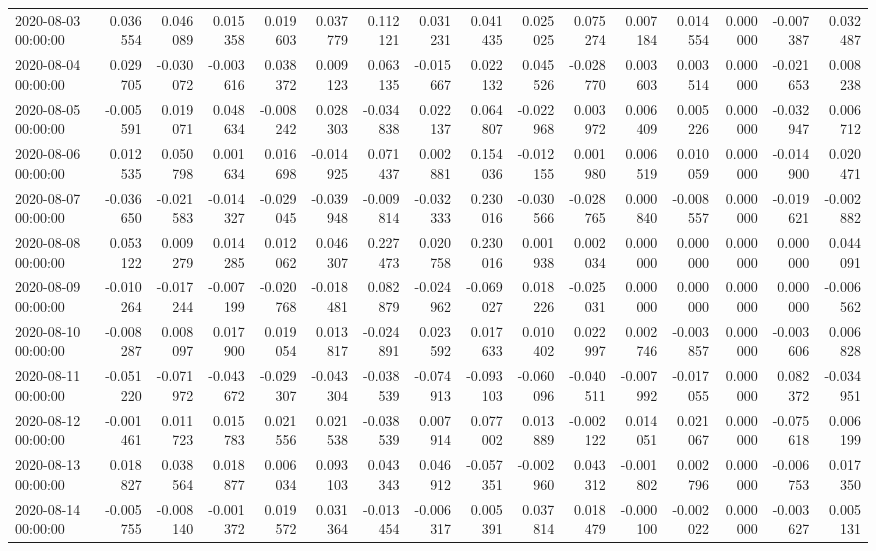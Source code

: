 \begin{tabular}{lrrrrrrrrrrrrrrr}
2020-08-03 00:00:00 & 0.036554 & 0.046089 & 0.015358 & 0.019603 & 0.037779 & 0.112121 & 0.031231 & 0.041435 & 0.025025 & 0.075274 & 0.007184 & 0.014554 & 0.000000 & -0.007387 & 0.032487 \\
2020-08-04 00:00:00 & 0.029705 & -0.030072 & -0.003616 & 0.038372 & 0.009123 & 0.063135 & -0.015667 & 0.022132 & 0.045526 & -0.028770 & 0.003603 & 0.003514 & 0.000000 & -0.021653 & 0.008238 \\
2020-08-05 00:00:00 & -0.005591 & 0.019071 & 0.048634 & -0.008242 & 0.028303 & -0.034838 & 0.022137 & 0.064807 & -0.022968 & 0.003972 & 0.006409 & 0.005226 & 0.000000 & -0.032947 & 0.006712 \\
2020-08-06 00:00:00 & 0.012535 & 0.050798 & 0.001634 & 0.016698 & -0.014925 & 0.071437 & 0.002881 & 0.154036 & -0.012155 & 0.001980 & 0.006519 & 0.010059 & 0.000000 & -0.014900 & 0.020471 \\
2020-08-07 00:00:00 & -0.036650 & -0.021583 & -0.014327 & -0.029045 & -0.039948 & -0.009814 & -0.032333 & 0.230016 & -0.030566 & -0.028765 & 0.000840 & -0.008557 & 0.000000 & -0.019621 & -0.002882 \\
2020-08-08 00:00:00 & 0.053122 & 0.009279 & 0.014285 & 0.012062 & 0.046307 & 0.227473 & 0.020758 & 0.230016 & 0.001938 & 0.002034 & 0.000000 & 0.000000 & 0.000000 & 0.000000 & 0.044091 \\
2020-08-09 00:00:00 & -0.010264 & -0.017244 & -0.007199 & -0.020768 & -0.018481 & 0.082879 & -0.024962 & -0.069027 & 0.018226 & -0.025031 & 0.000000 & 0.000000 & 0.000000 & 0.000000 & -0.006562 \\
2020-08-10 00:00:00 & -0.008287 & 0.008097 & 0.017900 & 0.019054 & 0.013817 & -0.024891 & 0.023592 & 0.017633 & 0.010402 & 0.022997 & 0.002746 & -0.003857 & 0.000000 & -0.003606 & 0.006828 \\
2020-08-11 00:00:00 & -0.051220 & -0.071972 & -0.043672 & -0.029307 & -0.043304 & -0.038539 & -0.074913 & -0.093103 & -0.060096 & -0.040511 & -0.007992 & -0.017055 & 0.000000 & 0.082372 & -0.034951 \\
2020-08-12 00:00:00 & -0.001461 & 0.011723 & 0.015783 & 0.021556 & 0.021538 & -0.038539 & 0.007914 & 0.077002 & 0.013889 & -0.002122 & 0.014051 & 0.021067 & 0.000000 & -0.075618 & 0.006199 \\
2020-08-13 00:00:00 & 0.018827 & 0.038564 & 0.018877 & 0.006034 & 0.093103 & 0.043343 & 0.046912 & -0.057351 & -0.002960 & 0.043312 & -0.001802 & 0.002796 & 0.000000 & -0.006753 & 0.017350 \\
2020-08-14 00:00:00 & -0.005755 & -0.008140 & -0.001372 & 0.019572 & 0.031364 & -0.013454 & -0.006317 & 0.005391 & 0.037814 & 0.018479 & -0.000100 & -0.002022 & 0.000000 & -0.003627 & 0.005131 \\

\end{tabular}
